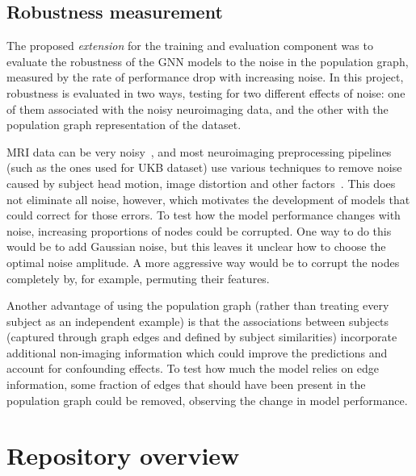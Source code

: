\subsection{Robustness measurement}
\label{section:implementation-robustness}

The proposed \textit{extension} for the training and evaluation component was to evaluate the robustness of the GNN models to the noise in the population graph, measured by the rate of performance drop with increasing noise. In this project, robustness is evaluated in two ways, testing for two different effects of noise: one of them associated with the noisy neuroimaging data, and the other with the population graph representation of the dataset.

MRI data can be very noisy~\cite{pervaiz2020optimising,niu2019improved}, and most neuroimaging preprocessing pipelines (such as the ones used for UKB dataset) use various techniques to remove noise caused by subject head motion, image distortion and other factors~\cite{glasser2013minimal}. This does not eliminate all noise, however, which motivates the development of models that could correct for those errors. 
To test how the model performance changes with noise, increasing proportions of nodes could be corrupted. One way to do this would be to add Gaussian noise, but this leaves it unclear how to choose the optimal noise amplitude. A more aggressive way would be to corrupt the nodes completely by, for example, permuting their features.

Another advantage of using the population graph (rather than treating every subject as an independent example) is that the associations between subjects (captured through graph edges and defined by subject similarities) incorporate additional non-imaging information which could improve the predictions and account for confounding effects. To test how much the model relies on edge information, some fraction of edges that should have been present in the population graph could be removed, observing the change in model performance. 


\section{Repository overview}

